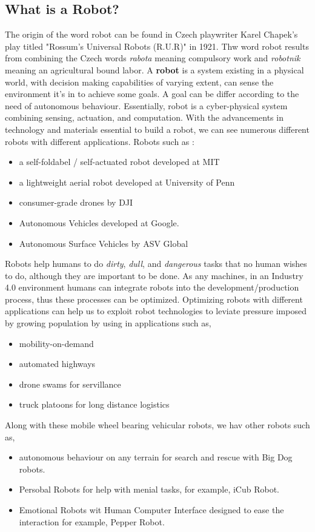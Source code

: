 \subsection{What is a Robot?}
The origin of the word robot can be found in Czech playwriter Karel Chapek's play titled "Rossum's
Universal Robots (R.U.R)" in 1921. Thw word robot results from combining the Czech words \textit{rabota} meaning 
compulsory work and \textit{robotnik} meaning an agricultural bound labor. A \textbf{robot} is a system existing 
in a physical world, with decision making capabilities of varying extent, can sense the environment it's in to achieve
some goals. A goal can be differ according to the need of autonomous behaviour. Essentially, robot is a cyber-physical system 
combining sensing, actuation, and computation. With the advancements in technology and materials essential to build a robot, we can
see numerous different robots with different applications. Robots such as : 
\begin{itemize}
    \item a self-foldabel / self-actuated robot developed at MIT \cite{Sung2016ComputationalDO}
    \item a lightweight aerial robot developed at University of Penn
    \item consumer-grade drones by DJI 
    \item Autonomous Vehicles developed at Google.
    \item Autonomous Surface Vehicles by ASV Global
\end{itemize}
Robots help humans to do \textit{dirty}, \textit{dull}, and \textit{dangerous} tasks that no human wishes to do, although they are
important to be done. As any machines, in an Industry 4.0 environment humans can integrate robots into the development/production process,
thus these processes can be optimized. Optimizing robots with different applications can help us to exploit robot technologies to leviate pressure
imposed by growing population by using in applications such as, \begin{itemize}
    \item  mobility-on-demand
    \item  automated highways
    \item  drone swams for servillance
    \item  truck platoons for long distance logistics
\end{itemize} Along with these mobile wheel bearing vehicular robots, we hav other robots such as,
\begin{itemize}
    \item autonomous behaviour on any terrain for search and rescue with Big Dog robots.
    \item Persobal Robots for help with menial tasks, for example, iCub Robot.
    \item Emotional Robots wit Human Computer Interface designed to ease the interaction for example, Pepper Robot.
\end{itemize}

